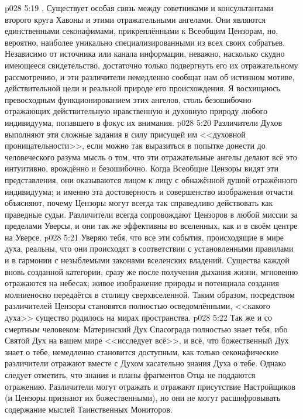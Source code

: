\vs p028 5:19 . Существует особая связь между советниками и консультантами второго круга Хавоны и этими отражательными ангелами. Они являются единственными секонафимами, прикреплёнными к Всеобщим Цензорам, но, вероятно, наиболее уникально специализированными из всех своих собратьев. Независимо от источника или канала информации, неважно, насколько скудно имеющееся свидетельство, достаточно только подвергнуть его их отражательному рассмотрению, и эти различители немедленно сообщат нам об истинном мотиве, действительной цели и реальной природе его происхождения. Я восхищаюсь превосходным функционированием этих ангелов, столь безошибочно отражающих действительную нравственную и духовную природу любого индивидуума, попавшего в фокус их внимания.
\vs p028 5:20 Различители Духов выполняют эти сложные задания в силу присущей им <<духовной проницательности>>, если можно так выразиться в попытке донести до человеческого разума мысль о том, что эти отражательные ангелы делают всё это интуитивно, врождённо и безошибочно. Когда Всеобщие Цензоры видят эти представления, они оказываются лицом к лицу с обнажённой душой отражённого индивидуума; и именно эта достоверность и совершенство изображения отчасти объясняют, почему Цензоры могут всегда так справедливо действовать как праведные судьи. Различители всегда сопровождают Цензоров в любой миссии за пределами Уверсы, и они так же эффективны во вселенных, как и в своём центре на Уверсе.
\vs p028 5:21 Уверяю тебя, что все эти события, происходящие в мире духа, реальны, что они происходят в соответствии с установленными правилами и в гармонии с незыблемыми законами вселенских владений. Существа каждой вновь созданной категории, сразу же после получения дыхания жизни, мгновенно отражаются на небесах; живое изображение природы и потенциала создания молниеносно передаётся в столицу сверхвселенной. Таким образом, посредством различителей Цензоры становятся полностью осведомлёнными, <<какого духа>> существо родилось на мирах пространства.
\vs p028 5:22 Так же и со смертным человеком: Материнский Дух Спасограда полностью знает тебя, ибо Святой Дух на вашем мире <<исследует всё>>, и всё, что божественный Дух знает о тебе, немедленно становится доступным, как только секонафические различители отражают вместе с Духом касательно знания Духа о тебе. Однако следует отметить, что знания и планы фрагментов Отца не поддаются отражению. Различители могут отражать и отражают присутствие Настройщиков (и Цензоры признают их божественными), но они не могут расшифровывать содержание мыслей Таинственных Мониторов.
